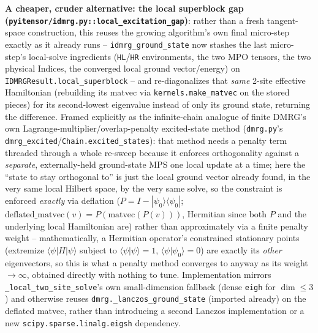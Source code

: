 \documentclass[11pt]{article}
\begin{document}
\textbf{A cheaper, cruder alternative: the local superblock gap
(\texttt{pyitensor/idmrg.py::local\_excitation\_gap})}: rather than a
fresh tangent-space construction, this reuses the growing algorithm's own
final micro-step exactly as it already runs -- \texttt{idmrg\_ground\_state}
now stashes the last micro-step's local-solve ingredients
(\texttt{HL}/\texttt{HR} environments, the two MPO tensors, the two
physical Indices, the converged local ground vector/energy) on
\texttt{IDMRGResult.local\_superblock} -- and re-diagonalizes that
\emph{same} 2-site effective Hamiltonian (rebuilding its matvec via
\texttt{kernels.make\_matvec} on the stored pieces) for its second-lowest
eigenvalue instead of only its ground state, returning the difference.
Framed explicitly as the infinite-chain analogue of finite DMRG's own
Lagrange-multiplier/overlap-penalty excited-state method
(\texttt{dmrg.py}'s \texttt{dmrg\_excited}/\texttt{Chain.excited\_states}):
that method needs a penalty term threaded through a whole re-sweep because
it enforces orthogonality against a \emph{separate}, externally-held
ground-state MPS one local update at a time; here the ``state to stay
orthogonal to'' is just the local ground vector already found, in the very
same local Hilbert space, by the very same solve, so the constraint is
enforced \emph{exactly} via deflation ($P = I - |\psi_0\rangle\langle\psi_0|$;
$\text{deflated\_matvec}(v) = P(\text{matvec}(P(v)))$, Hermitian since both
$P$ and the underlying local Hamiltonian are) rather than approximately via
a finite penalty weight -- mathematically, a Hermitian operator's
constrained stationary points (extremize $\langle\psi|H|\psi\rangle$
subject to $\langle\psi|\psi\rangle=1$, $\langle\psi|\psi_0\rangle=0$) are
exactly its \emph{other} eigenvectors, so this is what a penalty method
converges to anyway as its weight $\to\infty$, obtained directly with
nothing to tune. Implementation mirrors \texttt{\_local\_two\_site\_solve}'s
own small-dimension fallback (dense \texttt{eigh} for $\dim\le3$) and
otherwise reuses \texttt{dmrg.\_lanczos\_ground\_state} (imported already)
on the deflated matvec, rather than introducing a second Lanczos
implementation or a new \texttt{scipy.sparse.linalg.eigsh} dependency.
\end{document}
